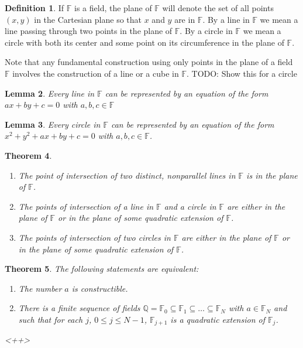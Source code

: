 \documentclass[11pt]{article}
\renewcommand\subset\subseteq
\newtheorem{theorem}{Theorem}[section]
\newtheorem{lemma}[theorem]{Lemma}
\theoremstyle{definition}
\newtheorem{definition}[theorem]{Definition}
\begin{document}
\begin{definition}
  If $\mathbb{F}$ is a field, the plane of $\mathbb{F}$ will denote the set of all points $(x,y)$ in the Cartesian plane so that $x$ and $y$ are in $\mathbb{F}$. By a line in
  $\mathbb{F}$ we mean a line passing through two points in the plane of $\mathbb{F}$. By a circle in $\mathbb{F}$ we mean a circle with both its center and some point on its
  circumference in the plane of $\mathbb{F}$.
\end{definition}

Note that any fundamental construction using only points in the plane of a field $\mathbb{F}$ involves the construction of a line or a cube in $\mathbb{F}$.
TODO: Show this for a circle

\begin{lemma}
  Every line in $\mathbb{F}$ can be represented by an equation of the form $ax+by+c = 0$ with $a,b,c\in\mathbb{F}$
  \label{lemma: line in F}
\end{lemma}

\begin{lemma}
  Every circle in $\mathbb{F}$ can be represented by an equation of the form $x^2 + y^2 + ax + by +c = 0$ with $a,b,c\in\mathbb{F}$.
  \label{lemma: circle in F}
\end{lemma}

\begin{theorem}
  \begin{enumerate}
    \item The point of intersection of two distinct, nonparallel lines in $\mathbb{F}$ is in the plane of $\mathbb{F}$.
    \item The points of intersection of a line in $\mathbb{F}$ and a circle in $\mathbb{F}$ are either in the plane of $\mathbb{F}$
      or in the plane of some quadratic extension of $\mathbb{F}$.
    \item The points of intersection of two circles in $\mathbb{F}$ are either in the plane of $\mathbb{F}$
      or in the plane of some quadratic extension of $\mathbb{F}$.
  \end{enumerate}
  \label{theorem: intersections}
\end{theorem}

\begin{theorem}
  The following statements are equivalent:
  \begin{enumerate}
    \item The number $a$ is constructible.
    \item There is a finite sequence of fields $\mathbb{Q} = \mathbb{F}_0 \subset \mathbb{F}_1\subset \dots \subset \mathbb{F}_N$ with
  $a\in\mathbb{F}_N$ and such that for each $j$, $0\leq j \leq N-1$, $\mathbb{F}_{j+1}$ is a quadratic extension of $\mathbb{F}_j$.
  \end{enumerate}<++>
  \label{theorem: constructible iff in sequence of quadratic extensions}
\end{theorem}
\end{document}
